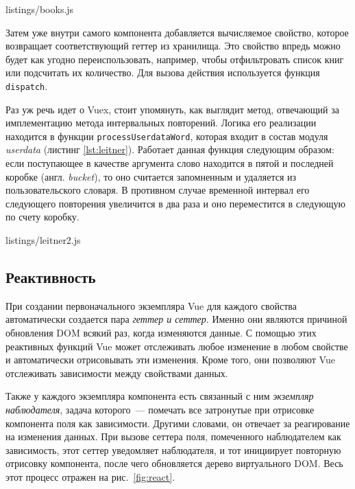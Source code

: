 
{listings/books.js}

\clearpage

Затем уже внутри самого компонента добавляется вычисляемое свойство, которое возвращает соответствующий геттер из хранилища. Это свойство впредь можно будет как угодно переиспользовать, например, чтобы отфильтровать список книг или подсчитать их количество. Для вызова действия используется функция \texttt{dispatch}.

Раз уж речь идет о Vuex, стоит упомянуть, как выглядит метод, отвечающий за имплементацию метода интервальных повторений. Логика его реализации находится в функции \texttt{processUserdataWord}, которая входит в состав модуля \textit{userdata} (листинг \ref{lst:leitner}). Работает данная функция следующим образом: если поступающее в качестве аргумента слово находится в пятой и последней коробке (англ. \textit{bucket}), то оно считается запомненным и удаляется из пользовательского словаря. В противном случае временной интервал его следующего повторения увеличится в два раза и оно переместится в следующую по счету коробку.


{listings/leitner2.js}

\subsection{Реактивность}

При создании первоначального экземпляра Vue для каждого свойства автоматически создается пара \textit{геттер и сеттер}. Именно они являются причиной обновления DOM всякий раз, когда изменяются данные. С помощью этих реактивных функций Vue может отслеживать любое изменение в любом свойстве и автоматически отрисовывать эти изменения. Кроме того, они позволяют Vue отслеживать зависимости между свойствами данных.

Также у каждого экземпляра компонента есть связанный с ним \textit{экземпляр наблюдателя}, задача которого~--- помечать все затронутые при отрисовке компонента поля как зависимости. Другими словами, он отвечает за реагирование на изменения данных. При вызове сеттера поля, помеченного наблюдателем как зависимость, этот сеттер уведомляет наблюдателя, и тот инициирует повторную отрисовку компонента, после чего обновляется дерево виртуального DOM. Весь этот процесс отражен на рис.~\ref{fig:react}.

